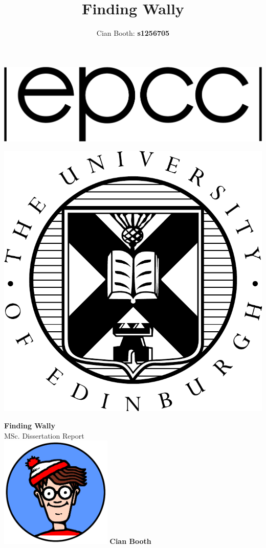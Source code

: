 \documentclass[a4paper,12pt]{article}
\author{Cian Booth: \textbf{s1256705}}
\title{Finding Wally}
\def\biblio {
  
  
}
\begin{document}
  \def\biblio{}
  \begin{minipage}{0.75\textwidth}
    \resizebox{72pt}{!} {
      \includegraphics{logos/logo_black}
    }
  \end{minipage}
  \begin{minipage}{0.2\textwidth}
    \resizebox{72pt}{!} {
      \includegraphics{logos/eucrest}
    }
  \end{minipage}
  \begin{center}
    \textbf{\Huge Finding Wally}\\
    {\Large MSc. Dissertation Report}\\
    \vfill
    \includegraphics[width=0.4\textwidth]{wallylogo}
    \vfill
    {\huge \textbf{Cian Booth}}\\
    \vspace{1em}
  \end{center}
  \pagebreak
  \tableofcontents
  \pagebreak
  
  
  
  \pagebreak
  
  
\end{document}

